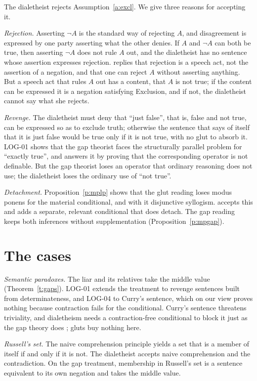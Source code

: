 \documentclass{situationist-preprint}
\begin{document}
The dialetheist rejects Assumption~\ref{a:excl}. We give three reasons for accepting it.

\emph{Rejection.} Asserting $\neg A$ is the standard way of rejecting $A$, and disagreement is expressed by one party asserting what the other denies. If $A$ and $\neg A$ can both be true, then asserting $\neg A$ does not rule $A$ out, and the dialetheist has no sentence whose assertion expresses rejection. \citet{Priest2006b} replies that rejection is a speech act, not the assertion of a negation, and that one can reject $A$ without asserting anything. But a speech act that rules $A$ out has a content, that $A$ is not true; if the content can be expressed it is a negation satisfying Exclusion, and if not, the dialetheist cannot say what she rejects.

\emph{Revenge.} The dialetheist must deny that \enquote{just false}, that is, false and not true, can be expressed so as to exclude truth; otherwise the sentence that says of itself that it is just false would be true only if it is not true, with no glut to absorb it. LOG-01 shows that the gap theorist faces the structurally parallel problem for \enquote{exactly true}, and answers it by proving that the corresponding operator is not definable. But the gap theorist loses an operator that ordinary reasoning does not use; the dialetheist loses the ordinary use of \enquote{not true}.

\emph{Detachment.} Proposition~\ref{p:mplp} shows that the glut reading loses modus ponens for the material conditional, and with it disjunctive syllogism. \citet{Priest2006} accepts this and adds a separate, relevant conditional that does detach. The gap reading keeps both inferences without supplementation (Proposition~\ref{p:mpgap}).

\section{The cases}

\emph{Semantic paradoxes.} The liar and its relatives take the middle value (Theorem~\ref{t:gaps}). LOG-01 extends the treatment to revenge sentences built from determinateness, and LOG-04 to Curry's sentence, which on our view proves nothing because contraction fails for the conditional. Curry's sentence threatens triviality, and dialetheism needs a contraction-free conditional to block it just as the gap theory does \citep{Beall2009}; gluts buy nothing here.

\emph{Russell's set.} The naive comprehension principle yields a set that is a member of itself if and only if it is not. The dialetheist accepts naive comprehension and the contradiction. On the gap treatment, membership in Russell's set is a sentence equivalent to its own negation and takes the middle value.
\end{document}

